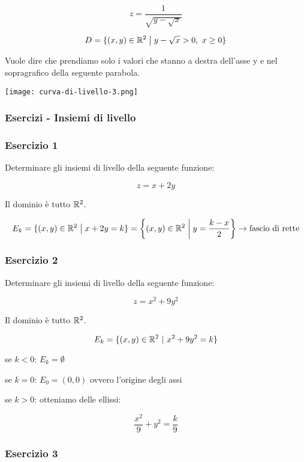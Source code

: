\[
    z = \frac{1}{\sqrt{y-\sqrt{x}}}
\]

\[
    D=\{(x,y) \in \R^{2} \giventhat y-\sqrt{x}>0,\ x \ge 0\}
\]

Vuole dire che prendiamo solo i valori che stanno a destra dell'asse y e nel sopragrafico della seguente parabola.

\begin{center}
    \texttt{[image: curva-di-livello-3.png]}
\end{center}

\pagebreak
\subsubsection{Esercizi {-} Insiemi di livello}

\subsubsection*{Esercizio 1}

Determinare gli insiemi di livello della seguente funzione:

\[
    z = x+2y
\]

Il dominio è tutto \(\R^2\).

\[
    E_k = \{(x,y) \in \R^2 \giventhat x+2y = k\} = \left\{(x,y) \in \R^2 \giventhat[\bigg] y = \frac{k-x}{2}\right\} \to \text{fascio di rette}
\]

\filbreak{}
\subsubsection*{Esercizio 2}

Determinare gli insiemi di livello della seguente funzione:

\[
    z = x^{2}+9y^{2}
\]

Il dominio è tutto \(\R^2\).

\[
    E_k = \{(x,y) \in \R^{2}\ \vert\ x^{2}+9y^{2}=k\}
\]

se \(k<0\): \(E_k = \emptyset \)

se \(k=0\): \(E_0=(0,0)\) ovvero l'origine degli assi

se \(k>0\): otteniamo delle ellissi:

\[
    \frac{x^{2}}{9}+ y^{2} = \frac{k}{9}
\]

\filbreak{}
\subsubsection*{Esercizio 3}


